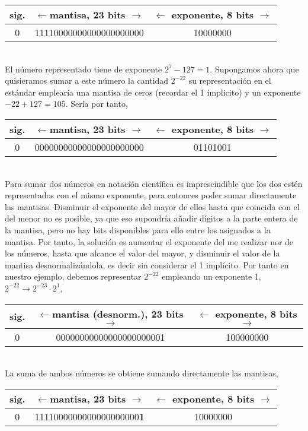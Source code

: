 \begin{tabular}{|c||c||c|}
\hline
sig.&$\leftarrow$mantisa, 23 bits $\rightarrow$&$\leftarrow$ exponente, 8 bits $\rightarrow$\\
\hline
0&11110000000000000000000&10000000\\
\hline
\end{tabular}\\

El número representado tiene de exponente $2^7-127=1$. Supongamos ahora que quisieramos sumar a este número la cantidad $2^{-22}$ su representación en el estándar emplearía una mantisa de ceros (recordar el 1 ímplicito) y un exponente $-22+127=105$. Sería por tanto,

\begin{tabular}{|c||c||c|}
\hline
sig.&$\leftarrow$mantisa, 23 bits $\rightarrow$&$\leftarrow$ exponente, 8 bits $\rightarrow$\\
\hline
0&00000000000000000000000&01101001\\
\hline
\end{tabular}\\

Para sumar dos números en notación científica es imprescindible que los dos estén representados con el mismo exponente, para entonces poder sumar directamente las mantisas. Disminuir el exponente del mayor de ellos hasta que coincida con el del menor no es posible, ya que eso supondría añadir dígitos a la parte entera de la mantisa, pero no hay bits disponibles para ello entre los asignados a la mantisa. Por tanto, la solución es aumentar el exponente del me realizar nor de los números, hasta que alcance el valor del mayor, y disminuir el valor de la mantisa desnormalizándola, es decir sin considerar el 1 implícito. 
Por tanto en nuestro ejemplo, debemos representar $2^{-22}$ empleando un exponente 1, $2^{-22}\rightarrow 2^{-23}\cdot 2^1$,

\begin{tabular}{|c||c||c|}
\hline
sig.&$\leftarrow$mantisa \textbf{(desnorm.)}, 23 bits $\rightarrow$&$\leftarrow$ exponente, 8 bits $\rightarrow$\\
\hline
0&00000000000000000000001&100000000\\
\hline
\end{tabular}\\

La suma de ambos números se obtiene sumando directamente las mantisas,

\begin{tabular}{|c||c||c|}
\hline
sig.&$\leftarrow$mantisa, 23 bits $\rightarrow$&$\leftarrow$ exponente, 8 bits $\rightarrow$\\
\hline
0&1111000000000000000000\textbf{1}&10000000\\
\hline
\end{tabular}\\

